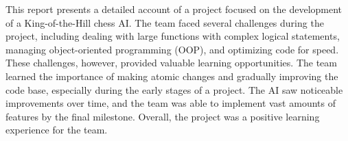 This report presents a detailed account of a project focused on the development of a King-of-the-Hill chess AI. The team faced several challenges during the project, including dealing with large functions with complex logical statements, managing object-oriented programming (OOP), and optimizing code for speed. These challenges, however, provided valuable learning opportunities. The team learned the importance of making atomic changes and gradually improving the code base, especially during the early stages of a project. The AI saw noticeable improvements over time, and the team was able to implement vast amounts of features  by the final milestone. Overall, the project was a positive learning experience for the team.
